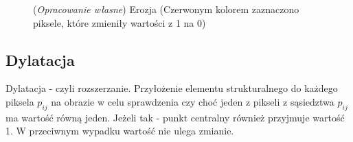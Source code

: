 \documentclass{article}
\begin{document}
        \begin{figure}[H]
            \centering
            \qquad
            \qquad
            \caption
            {
                (\textit{Opracowanie własne}) Erozja (Czerwonym kolorem zaznaczono piksele, które zmieniły wartości z 1 na 0)
            }
            \label{erozja}
        \end{figure}

        \subsection{Dylatacja}
        {
            \label{sec:dylatacja}
            \Large
            \justifying
            \quad
            Dylatacja - czyli rozszerzanie.
            Przyłożenie elementu strukturalnego do każdego piksela \(p_{ij}\) na obrazie w celu sprawdzenia czy choć jeden z pikseli z sąsiedztwa \(p_{ij}\) ma wartość równą jeden.
            Jeżeli tak - punkt centralny również przyjmuje wartość 1. W przeciwnym wypadku wartość nie ulega zmianie.
        }
\end{document}
